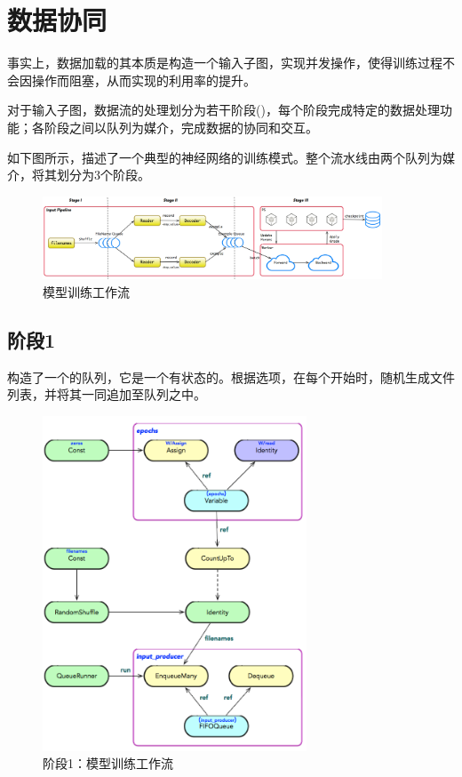 \section{数据协同}

\begin{content}

事实上，数据加载的其本质是构造一个输入子图，实现并发操作，使得训练过程不会因操作而阻塞，从而实现的利用率的提升。

对于输入子图，数据流的处理划分为若干阶段()，每个阶段完成特定的数据处理功能；各阶段之间以队列为媒介，完成数据的协同和交互。

如下图所示，描述了一个典型的神经网络的训练模式。整个流水线由两个队列为媒介，将其划分为3个阶段。

\begin{figure}[!htbp]
\centering
\includegraphics[width=0.9\textwidth]{figures/tf-input-pipeline.png}
\caption{模型训练工作流}
 \label{fig:tf-input-pipeline}
\end{figure}

\subsection{阶段1}

构造了一个的队列，它是一个有状态的。根据选项，在每个开始时，随机生成文件列表，并将其一同追加至队列之中。

\begin{figure}[!htbp]
\centering
\includegraphics[width=0.7\textwidth]{figures/tf-input-pipeline-stage-1.png}
\caption{阶段1：模型训练工作流}
 \label{fig:tf-input-pipeline-stage-1}
\end{figure}


\end{content}
